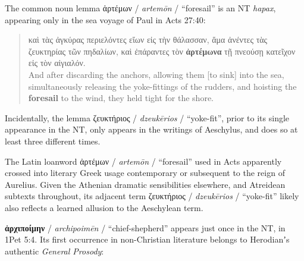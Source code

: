 The common noun lemma ἀρτέμων / \textit{artemōn} / “foresail” %
is an NT \textit{hapax}, appearing only in the sea voyage of Paul in Acts 27:40: %

\vspace*{2mm} 
 \begin{quote}καὶ τὰς ἀγκύρας περιελόντες εἴων εἰς τὴν θάλασσαν, %
 ἅμα ἀνέντες τὰς ζευκτηρίας τῶν πηδαλίων, %
 καὶ ἐπάραντες τὸν \textbf{ἀρτέμωνα} τῇ πνεούσῃ κατεῖχον εἰς τὸν αἰγιαλόν. \\[1mm] %
 And after discarding the anchors, allowing them [to sink] into the sea, %
 simultaneously releasing the yoke-fittings of the rudders, %
 and hoisting the \textbf{foresail} to the wind, %
 they held tight for the shore.\end{quote} %
 \vspace*{2mm} 

\noindent{}Incidentally, the lemma ζευκτήριος / \textit{dzeukērios} / “yoke-fit”, %
prior to its single appearance in the NT, %
only appears in the writings of Aeschylus, %
and does so at least three different times. %

The Latin loanword ἀρτέμων / \textit{artemōn} / “foresail” used in Acts %
apparently crossed into literary Greek usage contemporary or subsequent to the reign of Aurelius. %
Given the Athenian dramatic sensibilities elsewhere, %
and Atreidean subtexts throughout, %
its adjacent term ζευκτήριος / \textit{dzeukērios} / “yoke-fit” %
likely also reflects a learned allusion to the Aeschylean term. %
\clearpage

\noindent{}\textbf{ἀρχιποίμην} / \textit{archipoimēn} / “chief-shepherd” appears just once in the NT, %
in 1Pet 5:4. %
Its first occurrence in non-Christian literature belongs to Herodianʼs authentic \textit{General Prosody}: %

